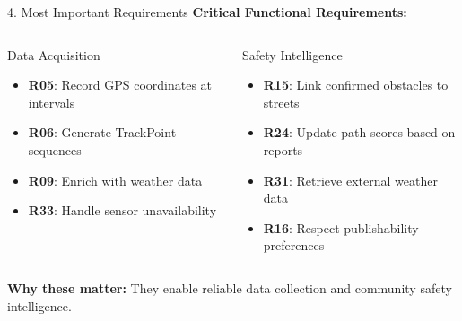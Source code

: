 \documentclass[aspectratio=169, 10pt]{beamer}
\begin{document}
\begin{frame}{4. Most Important Requirements}
    \textbf{Critical Functional Requirements:}
    
    \vspace{0.3cm}
    \begin{columns}[T]
        \begin{block}{Data Acquisition}
            \begin{itemize}
                \item \textbf{R05}: Record GPS coordinates at intervals
                \item \textbf{R06}: Generate TrackPoint sequences
                \item \textbf{R09}: Enrich with weather data
                \item \textbf{R33}: Handle sensor unavailability
            \end{itemize}
        \end{block}
        
        \begin{block}{Safety Intelligence}
            \begin{itemize}
                \item \textbf{R15}: Link confirmed obstacles to streets
                \item \textbf{R24}: Update path scores based on reports
                \item \textbf{R31}: Retrieve external weather data
                \item \textbf{R16}: Respect publishability preferences
            \end{itemize}
        \end{block}
    \end{columns}
    
    \vspace{0.3cm}
    \textbf{Why these matter:} They enable reliable data collection and community safety intelligence.
\end{frame}
\end{document}

